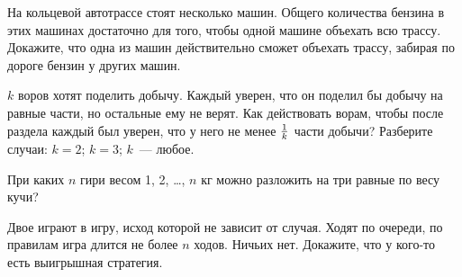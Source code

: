 \documentclass[a4paper,11pt]{article}
\begin{document}
На кольцевой автотрассе стоят несколько машин.
Общего количества бензина в этих машинах
достаточно для того, чтобы одной машине объехать всю трассу.
Докажите, что одна из машин действительно сможет объехать трассу,
забирая по дороге бензин у других машин.

$k$ воров хотят поделить добычу. Каждый уверен, что он поделил бы добычу
на равные части, но остальные ему не верят.  Как действовать ворам,
чтобы после раздела каждый был уверен, что у него не менее $1\over k$
части добычи? Разберите случаи:
$k=2$;
$k=3$;
$k$~--- любое.

При каких $n$ гири весом 1, 2, \dots, $n$ кг
можно разложить на три равные по весу кучи?


Двое играют в игру, исход которой не зависит от случая. %
Ходят по
очереди, по правилам игра длится не более $n$ ходов. Ничьих
нет. Докажите, что у кого-то есть выигрышная стратегия.

\vspace*{-2mm}
\vspace*{-3mm}
\end{document}
